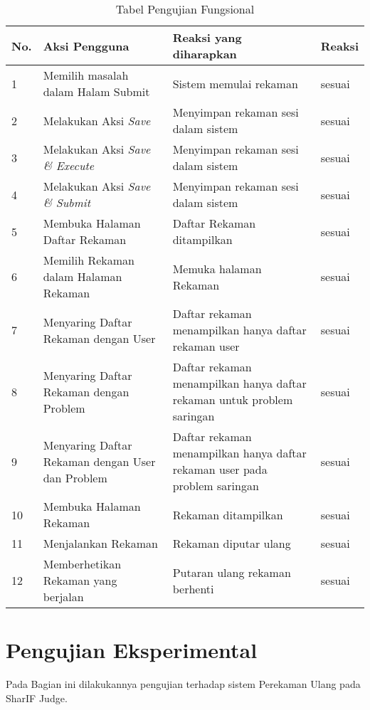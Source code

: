 \begin{table}[H]
	\centering
	\caption{Tabel Pengujian Fungsional}
	\begin{tabular}{|p{0.5cm}| p{5.5cm}| p{6cm}| p{2.5cm}|} \hline
	No.	& Aksi Pengguna	& Reaksi yang diharapkan & Reaksi \\ \hline
	1 	& Memilih masalah dalam Halam Submit & Sistem memulai rekaman &	sesuai	\\ \hline
	2 	& Melakukan Aksi \textit{Save} & Menyimpan rekaman sesi dalam sistem & sesuai	\\ \hline
	3 	& Melakukan Aksi \textit{Save \& Execute} & Menyimpan rekaman sesi dalam sistem & sesuai	\\ \hline
	4 	& Melakukan Aksi \textit{Save \& Submit} & Menyimpan rekaman sesi dalam sistem & sesuai	\\ \hline
	5 	& Membuka Halaman Daftar Rekaman & Daftar Rekaman ditampilkan & sesuai	\\ \hline
	6 	& Memilih Rekaman dalam Halaman Rekaman & Memuka halaman Rekaman & sesuai	\\ \hline
	7 	& Menyaring Daftar Rekaman dengan User & Daftar rekaman menampilkan hanya daftar rekaman user & sesuai	\\ \hline
	8 	& Menyaring Daftar Rekaman dengan Problem & Daftar rekaman menampilkan hanya daftar rekaman untuk problem saringan & sesuai	\\ \hline
	9 	& Menyaring Daftar Rekaman dengan User dan Problem & Daftar rekaman menampilkan hanya daftar rekaman user pada problem saringan & sesuai	\\ \hline
	10 	& Membuka Halaman Rekaman & Rekaman ditampilkan & sesuai	\\ \hline
	11 	& Menjalankan Rekaman & Rekaman diputar ulang & sesuai	\\ \hline
	12 	& Memberhetikan Rekaman yang berjalan & Putaran ulang rekaman berhenti & sesuai	\\ \hline

	\end{tabular}
	\label{table:fungsional}
\end{table}

\section{Pengujian Eksperimental}
\label{sec:5:eksperimental}

Pada Bagian ini dilakukannya pengujian terhadap sistem Perekaman Ulang pada SharIF Judge.

